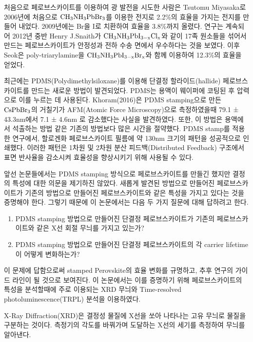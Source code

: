 처음으로 페로브스카이트를 이용하여 광 발전을 시도한 사람은 Tsutomu Miyasaka로 2006년에 처음으로 $\rm{CH_3NH_3PbBr_3}$를 이용한 전지로 2.2\%의 효율을 가지는 전지를 만들어 내었다\cite{kojima2006novel}. 2009년에는 Br을 I로 치환하여 효율을 3.8\%까지 올렸다\cite{kojima2009organometal}. 연구는 계속되어 2012년 중반 Henry J.Snaith가  $\rm{CH_{3}NH_3PbI_{3-x}Cl_x}$와 같이 17족 원소들을 섞어서 만드는 페로브스카이트가 안정성과 전하 수송 면에서 우수하다는 것을 보였다\cite{lee2012efficient}. 이후 Seok은 poly-triarylamine을 $\rm{CH_{3}NH_3PbI_{3-x}Br_x}$와 함께 이용하여 12.3\%의 효율을 얻었다\cite{noh2013chemical}.

최근에는 PDMS(Polydimethylsiloxane)를 이용해 단결정 할라이드(hallide) 페로브스카이트를 만드는 새로운 방법이 발견되었다. PDMS는 용액이 웨이퍼에 코팅된 후 압력으로 이를 누르는 데 사용된다. Khoram(2016)은 PDMS stamping으로 만든 $\rm{CsPbBr_3}$의 거칠기가  AFM(Atomic Force Microscopy)으로 측정하였을때 79.1 ± 43.3nm에서 7.1 ± 4.6nm 로 감소했다는 사실을 발견하였다\cite{khoram2016growth}. 또한, 이 방법은 용액에서 석출하는 방법 같은 기존의 방법보다 많은 시간을 절약했다. PDMS stamp를 적용한 연구에서, 할로겐화 페로브스카이트 필름에 약 130nm 크기의 패턴을 성공적으로 인쇄했다\cite{brittman2017controlling}. 이러한 패턴은 1차원 및 2차원 분산 피드백(Distributed Feedback) 구조에서 표면 반사율을 감소시켜 효율성을 향상시키기 위해 사용될 수 있다.

앞선 논문들에서는 PDMS stamping 방식으로 페로브스카이트를 만들긴 했지만 결정의 특성에 대한 의문을 제기하진 않았다. 새롭게 발견된 방법으로 만들어진 페로브스카이트가 기존의 방법으로 만들어진 페로브스카이트와 같은 특성을 가지고 있다는 것을 증명해야 한다. 그렇기 때문에 이 논문에서는 다음 두 가지 질문에 대해 답하려고 한다.

\begin{enumerate}
	\item PDMS stamping 방법으로 만들어진 단결정 페로브스카이트가 기존의 페로브스카이트와 같은 X선 회절 무늬를 가지고 있는가?
	\item PDMS stamping 방법으로 만들어진 단결정 페로브스카이트의 각 carrier lifetime이 어떻게 변화하는가?
\end{enumerate}

이 문제에 답함으로써 stamped Perovskite의 효율 변화를 규명하고, 추후 연구의 가이드 라인이 될 것으로 보여진다. 이 논문에서는 이를 증명하기 위해 페로브스카이트의 특성을 분석할때에 주로 이용되는 XRD 무늬와 Time-resolved photoluminescence(TRPL) 분석을 이용하였다.

X-Ray Diffraction(XRD)은 결정성 물질에 X선을 쏘아 나타나는 고유 무늬로 물질을 구분하는 것이다. 측정기의 각도를 바꿔가며 도달하는 X선의 세기를 측정하여 무늬를 알아낸다. 

